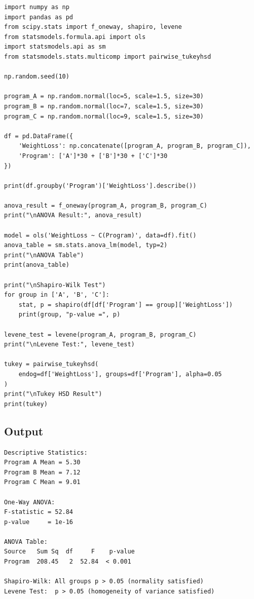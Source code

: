 \documentclass[12pt,a4paper]{article}
\begin{document}
\begin{lstlisting}[style=pythonstyle, caption={One-Way ANOVA}]
import numpy as np
import pandas as pd
from scipy.stats import f_oneway, shapiro, levene
from statsmodels.formula.api import ols
import statsmodels.api as sm
from statsmodels.stats.multicomp import pairwise_tukeyhsd

np.random.seed(10)

program_A = np.random.normal(loc=5, scale=1.5, size=30)
program_B = np.random.normal(loc=7, scale=1.5, size=30)
program_C = np.random.normal(loc=9, scale=1.5, size=30)

df = pd.DataFrame({
    'WeightLoss': np.concatenate([program_A, program_B, program_C]),
    'Program': ['A']*30 + ['B']*30 + ['C']*30
})

print(df.groupby('Program')['WeightLoss'].describe())

anova_result = f_oneway(program_A, program_B, program_C)
print("\nANOVA Result:", anova_result)

model = ols('WeightLoss ~ C(Program)', data=df).fit()
anova_table = sm.stats.anova_lm(model, typ=2)
print("\nANOVA Table")
print(anova_table)

print("\nShapiro-Wilk Test")
for group in ['A', 'B', 'C']:
    stat, p = shapiro(df[df['Program'] == group]['WeightLoss'])
    print(group, "p-value =", p)

levene_test = levene(program_A, program_B, program_C)
print("\nLevene Test:", levene_test)

tukey = pairwise_tukeyhsd(
    endog=df['WeightLoss'], groups=df['Program'], alpha=0.05
)
print("\nTukey HSD Result")
print(tukey)
\end{lstlisting}

\subsection{Output}

\begin{lstlisting}[style=outputstyle]
Descriptive Statistics:
Program A Mean = 5.30
Program B Mean = 7.12
Program C Mean = 9.01

One-Way ANOVA:
F-statistic = 52.84
p-value     = 1e-16

ANOVA Table:
Source   Sum Sq  df     F    p-value
Program  208.45   2  52.84  < 0.001

Shapiro-Wilk: All groups p > 0.05 (normality satisfied)
Levene Test:  p > 0.05 (homogeneity of variance satisfied)
\end{lstlisting}
\end{document}
